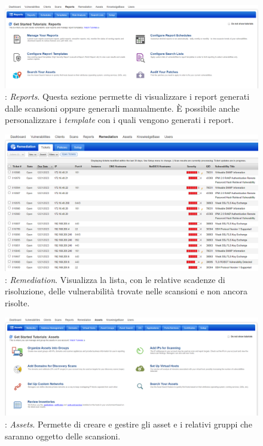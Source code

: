 \documentclass[target=bach,aauheader=]{thud}
\begin{document}
\begin{figure}
\centering
\includegraphics[scale=0.329]{images/qualys_reports.png}
    \caption{: \textit{Reports}. Questa sezione permette di visualizzare i report generati dalle scansioni oppure generarli manualmente. È possibile anche personalizzare i \textit{template} con i quali vengono generati i report.}
\end{figure}

\begin{figure}[!]
\centering
\includegraphics[scale=0.425]{images/qualys_remediation.png}
    \caption{: \textit{Remediation}. Visualizza la lista, con le relative scadenze di risoluzione, delle vulnerabilità trovate nelle scansioni e non ancora risolte.}
\end{figure}

\begin{figure}[h]
\centering
\includegraphics[scale=0.329]{images/qualys_assets.png}
    \caption{: \textit{Assets}. Permette di creare e gestire gli asset e i relativi gruppi che saranno oggetto delle scansioni.}
\end{figure}
\end{document}
